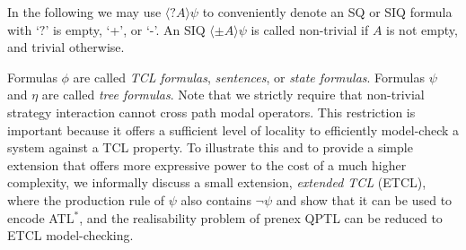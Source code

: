 In the following we may use $\langle?A\rangle\psi$ to conveniently 
denote an SQ or SIQ formula with `$?$' is empty, `+', or `-'.  
An SIQ $\langle\pm A\rangle\psi$ is called non-trivial if 
$A$ is not empty, and trivial otherwise. 

Formulas $\phi$ are called {\em TCL} {\em formulas}, {\em sentences}, or 
{\em state formulas}.  
Formulas $\psi$ and $\eta$ are called {\em tree formulas}.  
Note that we strictly require that non-trivial strategy interaction cannot 
cross path modal operators.  
This restriction is important because it offers a sufficient level of locality to efficiently model-check a system against a TCL property.
To illustrate this and to provide a simple extension that offers more expressive power to the cost of a much higher complexity, we informally discuss a small extension,
\emph{extended TCL} (ETCL), where the production rule of $\psi$ also contains $\neg \psi$ and show that it can be used to encode ATL$^*$, and the realisability problem of prenex QPTL can be reduced to ETCL model-checking.



